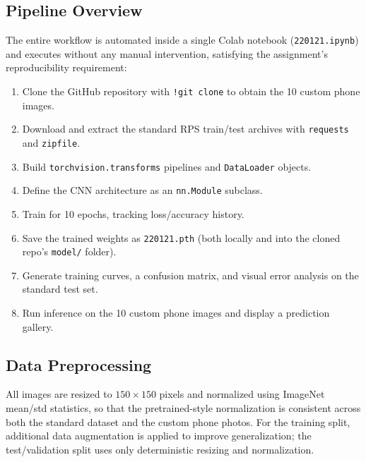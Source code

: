 \documentclass[11pt,a4paper]{article}
\begin{document}
\subsection{Pipeline Overview}
The entire workflow is automated inside a single Colab notebook (\texttt{220121.ipynb}) and executes without any manual intervention, satisfying the assignment's reproducibility requirement:
\begin{enumerate}[leftmargin=1.3cm]
    \item Clone the GitHub repository with \texttt{!git clone} to obtain the 10 custom phone images.
    \item Download and extract the standard RPS train/test archives with \texttt{requests} and \texttt{zipfile}.
    \item Build \texttt{torchvision.transforms} pipelines and \texttt{DataLoader} objects.
    \item Define the CNN architecture as an \texttt{nn.Module} subclass.
    \item Train for 10 epochs, tracking loss/accuracy history.
    \item Save the trained weights as \texttt{220121.pth} (both locally and into the cloned repo's \texttt{model/} folder).
    \item Generate training curves, a confusion matrix, and visual error analysis on the standard test set.
    \item Run inference on the 10 custom phone images and display a prediction gallery.
\end{enumerate}

\subsection{Data Preprocessing}
All images are resized to $150\times150$ pixels and normalized using ImageNet mean/std statistics, so that the pretrained-style normalization is consistent across both the standard dataset and the custom phone photos. For the training split, additional data augmentation is applied to improve generalization; the test/validation split uses only deterministic resizing and normalization.
\end{document}
